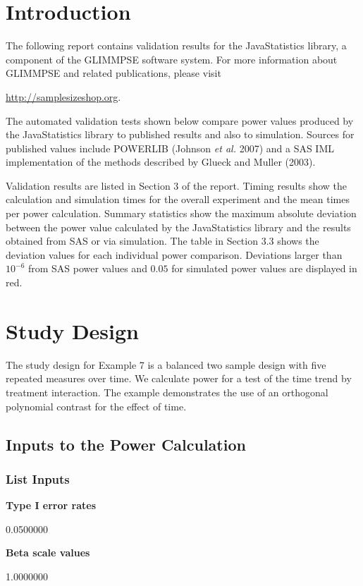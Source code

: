 \documentclass{glimmpse-report}
\begin{document}
\section{Introduction}
The following report contains validation results for the JavaStatistics library, a component of the GLIMMPSE software system.  For more information about GLIMMPSE and related publications, please visit

 

\href{http://samplesizeshop.org}{http://samplesizeshop.org}.

The automated validation tests shown below compare power values produced by the JavaStatistics library to published results and also to simulation.  Sources for published values include POWERLIB (Johnson \emph{et al.} 2007) and a SAS IML implementation of the methods described by Glueck and Muller (2003).

Validation results are listed in Section 3 of the report.  Timing results show the calculation and simulation times for the overall experiment and the mean times per power calculation.  Summary statistics show the maximum absolute deviation between the power value calculated by the JavaStatistics library and the results obtained from SAS or via simulation.  The table in Section 3.3 shows the deviation values for each individual power comparison.  Deviations larger than $10^{-6}$ from SAS power values and $0.05$ for simulated power values are displayed in red.

 \section{Study Design}
The study design for Example 7 is a balanced two sample design with five repeated measures over time. We calculate power for a test of the time trend by treatment interaction.  The example demonstrates the use of an orthogonal polynomial contrast for the effect of time.
\subsection{Inputs to the Power Calculation}
\subsubsection{List Inputs}

{\bf Type I error rates}

0.0500000

{\bf Beta scale values}

1.0000000
\end{document}
